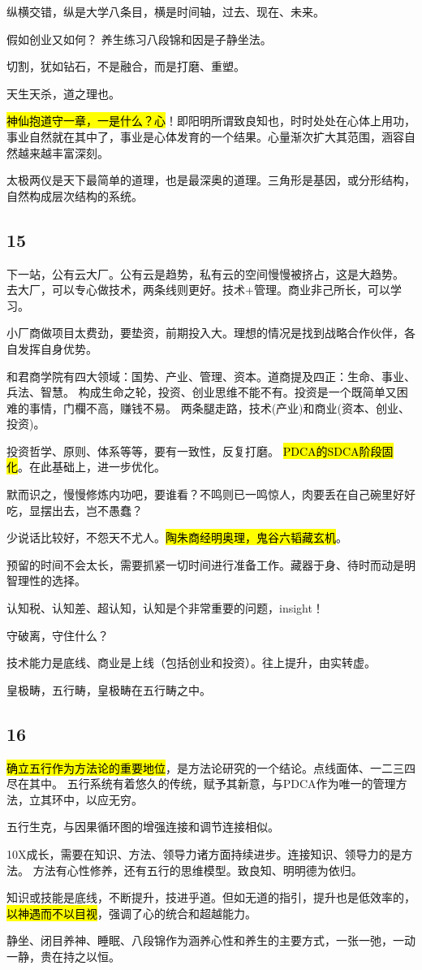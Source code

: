 纵横交错，纵是大学八条目，横是时间轴，过去、现在、未来。

假如创业又如何？ 养生练习八段锦和因是子静坐法。

切割，犹如钻石，不是融合，而是打磨、重塑。

天生天杀，道之理也。

\hl{神仙抱道守一章，一是什么？心}！即阳明所谓致良知也，时时处处在心体上用功，
事业自然就在其中了，事业是心体发育的一个结果。心量渐次扩大其范围，涵容自然越来越丰富深刻。

太极两仪是天下最简单的道理，也是最深奥的道理。三角形是基因，或分形结构，自然构成层次结构的系统。

\subsection{15}

下一站，公有云大厂。公有云是趋势，私有云的空间慢慢被挤占，这是大趋势。
去大厂，可以专心做技术，两条线则更好。技术+管理。商业非己所长，可以学习。

小厂商做项目太费劲，要垫资，前期投入大。理想的情况是找到战略合作伙伴，各自发挥自身优势。

和君商学院有四大领域：国势、产业、管理、资本。道商提及四正：生命、事业、兵法、智慧。
构成生命之轮，投资、创业思维不能不有。投资是一个既简单又困难的事情，门欄不高，赚钱不易。
两条腿走路，技术(产业)和商业(资本、创业、投资)。

投资哲学、原则、体系等等，要有一致性，反复打磨。
\hl{PDCA的SDCA阶段固化}。在此基础上，进一步优化。

默而识之，慢慢修炼内功吧，要谁看？不鸣则已一鸣惊人，肉要丢在自己碗里好好吃，显摆出去，岂不愚蠢？

少说话比较好，不怨天不尤人。\hl{陶朱商经明奥理，鬼谷六韬藏玄机}。

预留的时间不会太长，需要抓紧一切时间进行准备工作。藏器于身、待时而动是明智理性的选择。

认知税、认知差、超认知，认知是个非常重要的问题，insight！

守破离，守住什么？

技术能力是底线、商业是上线（包括创业和投资）。往上提升，由实转虚。

皇极畴，五行畴，皇极畴在五行畴之中。

\subsection{16}

\hl{确立五行作为方法论的重要地位}，是方法论研究的一个结论。点线面体、一二三四尽在其中。
五行系统有着悠久的传统，赋予其新意，与PDCA作为唯一的管理方法，立其环中，以应无穷。

五行生克，与因果循环图的增强连接和调节连接相似。

10X成长，需要在知识、方法、领导力诸方面持续进步。连接知识、领导力的是方法。
方法有心性修养，还有五行的思维模型。致良知、明明德为依归。

知识或技能是底线，不断提升，技进乎道。但如无道的指引，提升也是低效率的，
\hl{以神遇而不以目视}，强调了心的统合和超越能力。

静坐、闭目养神、睡眠、八段锦作为涵养心性和养生的主要方式，一张一弛，一动一静，贵在持之以恒。

